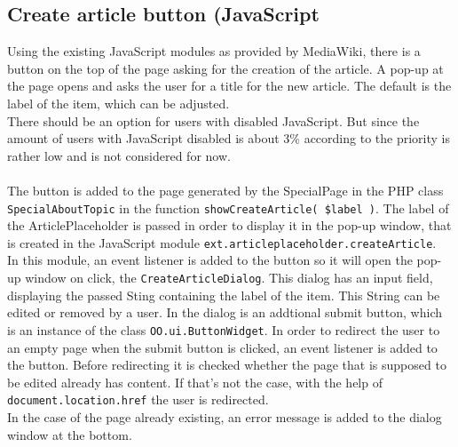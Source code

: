 \subsection{Create article button (JavaScript}
		
Using the existing JavaScript modules as provided by MediaWiki, there is a button on the top of the page asking for the creation of the article. A pop-up at the page opens and asks the user for a title for the new article. The default is the label of the item, which can be adjusted. \\
There should be an option for users with disabled JavaScript. But since the amount of users with JavaScript disabled is about 3\% according to \citet{wiki:02}  the priority is rather low and is not considered for now. \\
\\
The button is added to the page generated by the SpecialPage in the PHP class \texttt{SpecialAboutTopic} in the function \texttt{showCreateArticle( \$label )}. The label of the ArticlePlaceholder is passed in order to display it in the pop-up window, that is created in the JavaScript module \texttt{ext.articleplaceholder.createArticle}. \\
In this module, an event listener is added to the button so it will open the pop-up window on click, the \texttt{CreateArticleDialog}. This dialog has an input field, displaying the passed Sting containing the label of the item. This String can be edited or removed by a user. In the dialog is an addtional submit button, which is an instance of the class \texttt{OO.ui.ButtonWidget}. In order to redirect the user to an empty page when the submit button is clicked, an event listener is added to the button. Before redirecting it is checked whether the page that is supposed to be edited already has content. If that's not the case, with the help of \texttt{document.location.href} the user is redirected. \\
In the case of the page already existing, an error message is added to the dialog window at the bottom. 